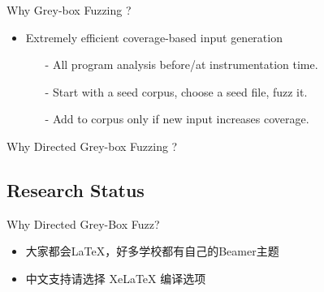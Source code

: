 \documentclass[10pt,aspectratio=43]{beamer}
\begin{document}
\begin{frame}{Why Grey-box Fuzzing ?}
{\begin{itemize}
            \item \textcolor{deepgreen}{Extremely efficient} coverage-based input generation 
                \begin{itemize}
                    \item[-]   All program analysis before/at \textcolor{deepred}{instrumentation time}.
                    \item[-]   Start with a seed corpus, choose a seed file, fuzz it.
                    \item[-]   Add to corpus only if new input increases coverage.
                \end{itemize} 
        \end{itemize}
    } 
\end{frame}

\begin{frame}{Why Directed Grey-box Fuzzing ?}
    
\end{frame}


\subsection{Research Status }
\begin{frame}{ Why Directed Grey-Box Fuzz?}
    \begin{itemize}[<+-| alert@+>] %
        \item 大家都会\LaTeX{}，好多学校都有自己的Beamer主题
        \item 中文支持请选择 Xe\LaTeX{} 编译选项
    \end{itemize}
\end{frame}



\end{document}
